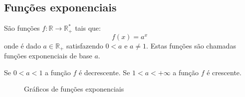 \begin{itemize}

  \end{itemize}

 \subsection{Funções exponenciais}

 São funções $f: \mathbb{R} \rightarrow \mathbb{R_{+}^{*}} $ tais que:
 \[f(x) = a^x\]
 onde é dado $a \in \mathbb{R_{+}}$ satisfazendo $0 < a$ e $a \neq 1$. Estas funções são chamadas funções exponenciais de base $a$.

 Se $0 < a < 1$ a função $f$ é decrescente. Se $1 < a < +\infty$ a função $f$ é crescente.

 \begin{figure}[H]
   \caption{Gráficos de funções exponenciais}
  \end{figure}

